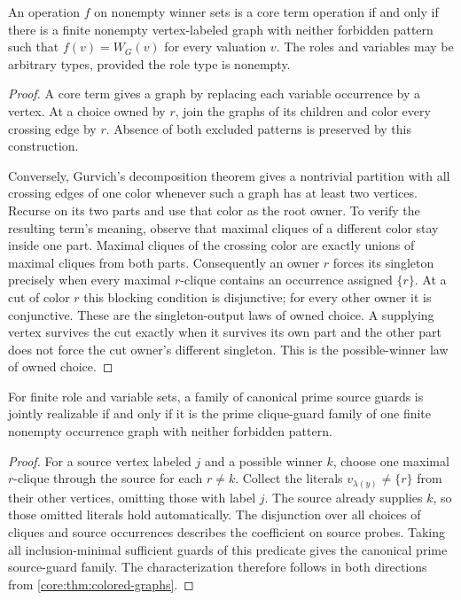 \begin{theorem}
\label{core:thm:colored-graphs}
An operation $f$ on nonempty winner sets is a core term operation if and
only if there is a finite nonempty vertex-labeled graph with neither
forbidden pattern such that $f(v)=W_G(v)$ for every valuation $v$.
The roles and variables may be arbitrary types, provided the role type
is nonempty.
\end{theorem}
\begin{proof}
A core term gives a graph by replacing each variable occurrence by a
vertex. At a choice owned by $r$, join the graphs of its children and
color every crossing edge by $r$. Absence of both excluded patterns is preserved
by this construction.

Conversely, Gurvich's decomposition theorem \cite{Gurvich2009} gives a
nontrivial partition with all crossing edges of one color whenever such
a graph has at least two vertices. Recurse on its two parts and use that color as the root owner.
To verify the resulting term's meaning, observe that maximal cliques of
a different color stay inside one part. Maximal cliques of the crossing
color are exactly unions of maximal cliques from both parts.
Consequently an owner $r$ forces its singleton precisely when every
maximal $r$-clique contains an occurrence assigned $\{r\}$. At a cut of
color $r$ this blocking condition is disjunctive; for every other owner
it is conjunctive. These are the singleton-output laws of owned choice.
A supplying vertex survives the cut exactly when it survives its own
part and the other part does not force the cut owner's different
singleton. This is the possible-winner law of owned choice.
\end{proof}

\begin{corollary}\label{core:cor:graph-guards}
For finite role and variable sets, a family of canonical prime source
guards is jointly realizable if and only if it is the prime clique-guard family of one finite nonempty
occurrence graph with neither forbidden pattern.
\end{corollary}
\begin{proof}
For a source vertex labeled $j$ and a possible winner $k$, choose one maximal
$r$-clique through the source for each $r\ne k$. Collect the literals
$v_{\lambda(y)}\ne\{r\}$ from their other vertices, omitting those with
label $j$. The source already supplies $k$, so those omitted literals
hold automatically. The disjunction over all choices of cliques and
source occurrences describes the coefficient on source probes. Taking
all inclusion-minimal sufficient guards of this predicate gives the
canonical prime source-guard family. The characterization
therefore follows in both directions from \cref{core:thm:colored-graphs}.
\end{proof}

